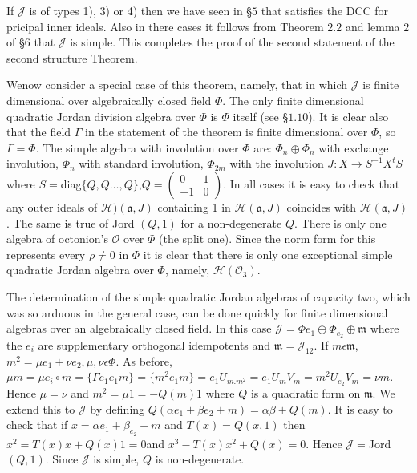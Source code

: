 {If $\mathscr{J}$ is of types 1), 3) or 4) then we have seen in \S $5$
that satisfies the DCC for pricipal inner ideals. Also in there cases
it follows from Theorem $2.2$ and lemma $2$ of \S $6$ that
$\mathscr{J}$ is simple. This completes the proof of the second
statement of the second structure Theorem.

We\pageoriginale now consider a special case of this theorem, namely,
that in which $\mathscr{J}$ is finite dimensional over algebraically
closed field $\Phi$. The only finite dimensional quadratic Jordan
division algebra over $\Phi$ is $\Phi$ itself (see \S $1.10$). It is
clear also that the field $\Gamma$ in the statement of the theorem is
finite dimensional over $\Phi$, so $\Gamma=\Phi$. The simple algebra
with involution over $\Phi$ are: $\Phi_n\oplus \Phi_n$ with exchange
involution, $\Phi_n$ with standard involution, $\Phi_{2m}$ with the
involution $J:X\to S^{-1} X^{t}S$ where
$S=$diag$\{Q,Q\ldots,Q\}$,$Q=
\begin{pmatrix}
0 & 1\\
-1 & 0
\end{pmatrix}$. In all cases it is easy to check that any outer ideals
of $\mathscr{H})(\mathfrak{a},J)$ containing 1 in
$\mathscr{H}(\mathfrak{a},J)$ coincides with
$\mathscr{H}(\mathfrak{a},J)$. The same is true of Jord $(Q,1)$ for a
non-degenerate $Q$. There is only one algebra of octonion's
$\mathcal{O}$ over $\Phi$ (the split one). Since the norm form for
this represents every $\rho\neq 0$ in $\Phi$ it is clear that there is
only one exceptional simple quadratic Jordan algebra over $\Phi$,
namely, $\mathscr{H}(\mathcal{O}_3)$.

The determination of the simple quadratic Jordan algebras of capacity
two, which was so arduous in the general case, can be done quickly for
finite dimensional algebras over an algebraically closed field. In
this case $\mathscr{J}=\Phi e_1\oplus \Phi_{e_2}\oplus \mathfrak{m}$
where the $e_i$ are supplementary orthogonal idempotents and
$\mathfrak{m}=\mathscr{J}_{12}$. If $m\epsilon \mathfrak{m}$,
$m^{2}=\mu e_1+\nu e_2, \mu, \nu \epsilon \Phi$. As before,
$\mu m=\mu e_i \circ m=\{\Gamma
e_1e_1m\}=\{m^{2}e_1m\}=e_1U_{m.m^{2}}=e_1U_mV_m=m^{2}U_{e_2}V_m=\nu
m$. Hence $\mu=\nu$ and $m^{2}=\mu 1 =-Q(m)1$ where $Q$ is a
quadratic form on $\mathfrak{m}$. We extend this to $\mathscr{J}$ by
defining $Q(\alpha e_1+\beta e_2+m)=\alpha\beta+Q(m)$. It is easy to
check that if $x=\alpha e_1+\beta_{e_2}+m $ and $T(x)=Q(x,1)$ then
$x^{2}=T(x)x+Q(x)1=0$\pageoriginale and
$x^{3}-T(x)x^{2}+Q(x)=0$. Hence $\mathscr{J}=$Jord $(Q,1)$. Since
$\mathscr{J}$ is simple, $Q$ is non-degenerate.

}
